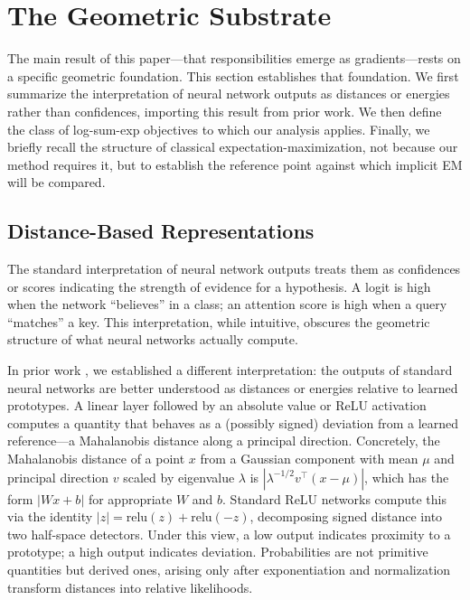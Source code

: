 \section{The Geometric Substrate}

The main result of this paper---that responsibilities emerge as gradients---rests on a specific geometric foundation. This section establishes that foundation. We first summarize the interpretation of neural network outputs as distances or energies rather than confidences, importing this result from prior work. We then define the class of log-sum-exp objectives to which our analysis applies. Finally, we briefly recall the structure of classical expectation-maximization, not because our method requires it, but to establish the reference point against which implicit EM will be compared.

\subsection{Distance-Based Representations}

The standard interpretation of neural network outputs treats them as confidences or scores indicating the strength of evidence for a hypothesis. A logit is high when the network ``believes'' in a class; an attention score is high when a query ``matches'' a key. This interpretation, while intuitive, obscures the geometric structure of what neural networks actually compute.

In prior work \citep{oursland2024interpreting}, we established a different interpretation: the outputs of standard neural networks are better understood as distances or energies relative to learned prototypes. A linear layer followed by an absolute value or ReLU activation computes a quantity that behaves as a (possibly signed) deviation from a learned reference---a Mahalanobis distance along a principal direction. Concretely, the Mahalanobis distance of a point $x$ from a Gaussian component with mean $\mu$ and principal direction $v$ scaled by eigenvalue $\lambda$ is $|{\lambda}^{-1/2} v^\top (x - \mu)|$, which has the form $|Wx + b|$ for appropriate $W$ and $b$. Standard ReLU networks compute this via the identity $|z| = \text{relu}(z) + \text{relu}(-z)$, decomposing signed distance into two half-space detectors. Under this view, a low output indicates proximity to a prototype; a high output indicates deviation. Probabilities are not primitive quantities but derived ones, arising only after exponentiation and normalization transform distances into relative likelihoods.

